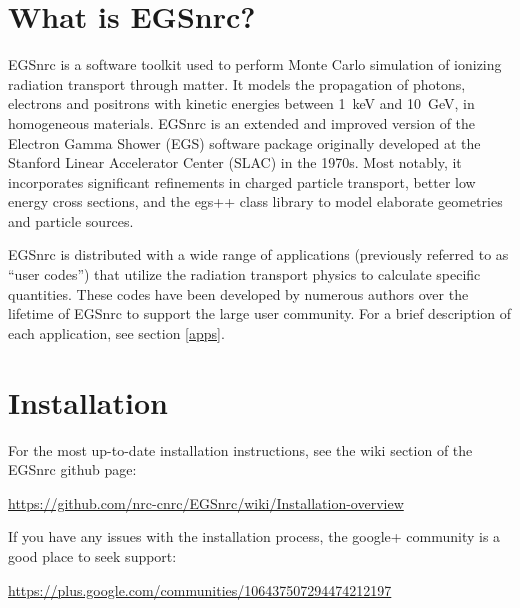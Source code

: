 \documentclass[12pt,twoside]{article}
\begin{document}
\newpage
\mbox{}	%
\newpage
\setcounter{page}{1}
\pagestyle{fancy}

\tableofcontents

\newpage


\section{What is EGSnrc?}
EGSnrc is a software toolkit used to perform Monte Carlo simulation of
ionizing radiation transport through matter. It models the propagation
of photons, electrons and positrons with kinetic energies between
1~keV and 10~GeV, in homogeneous materials. EGSnrc is an
extended and improved version of the Electron Gamma Shower (EGS)
software package originally developed at the Stanford Linear Accelerator
Center (SLAC) in the 1970s. Most notably, it incorporates significant
refinements in charged particle transport, better low energy cross
sections, and the egs++ class library to model elaborate geometries and
particle sources.

EGSnrc is distributed with a wide range of applications (previously referred to
as ``user codes'') that utilize the radiation transport physics to calculate
specific quantities. These codes have been developed by numerous authors over
the lifetime of EGSnrc to support the large user community. For a brief
description of each application, see section \ref{apps}.

\section{Installation}

For the most up-to-date installation instructions, see the wiki section of the
EGSnrc github page:

\href{https://github.com/nrc-cnrc/EGSnrc/wiki/Installation-overview}{https://github.com/nrc-cnrc/EGSnrc/wiki/Installation-overview}

If you have any issues with the installation process, the google+ community is a good place to seek support:

\href{https://plus.google.com/communities/106437507294474212197}{https://plus.google.com/communities/106437507294474212197}

\end{document}
